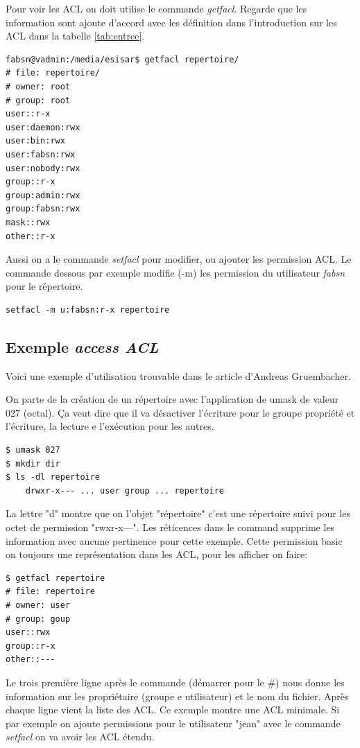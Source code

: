 Pour voir les ACL on doit utilise le commande \emph{getfacl}. Regarde que les information sont ajoute d'accord avec les définition dans l'introduction sur les ACL dans la tabelle \ref{tab:entree}. 

\begin{verbatim}
fabsn@vadmin:/media/esisar$ getfacl repertoire/
# file: repertoire/
# owner: root
# group: root
user::r-x
user:daemon:rwx
user:bin:rwx
user:fabsn:rwx
user:nobody:rwx
group::r-x
group:admin:rwx
group:fabsn:rwx
mask::rwx
other::r-x	
\end{verbatim}

Aussi on a le commande \emph{setfacl} pour modifier, ou ajouter les permission ACL. Le commande dessous par exemple modifie (-m) les permission du utilisateur \emph{fabsn} pour le répertoire. 

\begin{verbatim}
setfacl -m u:fabsn:r-x repertoire
\end{verbatim}

\subsection*{Exemple \emph{access ACL}}

Voici une exemple d'utilisation trouvable dans le article d'Andreas Gruembacher\cite{aclsuse}.

On parte de la création de un répertoire avec l'application de umask de valeur 027 (octal). Ça veut dire que il va   désactiver l'écriture pour le groupe propriété et l'écriture, la lecture e l'exécution pour les autres.

\begin{verbatim}
$ umask 027 
$ mkdir dir 
$ ls -dl repertoire
	drwxr-x--- ... user group ... repertoire
\end{verbatim}

La lettre "d" montre que on l'objet "répertoire" c'est une répertoire suivi pour les octet de permission "rwxr-x---". Les réticences dans le command supprime les information avec aucune pertinence pour cette exemple. Cette permission basic on toujours une représentation dans les ACL, pour les afficher on faire:

\begin{verbatim}
$ getfacl repertoire
# file: repertoire 
# owner: user 
# group: goup
user::rwx
group::r-x
other::---
\end{verbatim}

Le trois première ligne après le commande (démarrer pour le \#) nous donne les information sur les propriétaire (groupe e utilisateur) et le nom du fichier. Après chaque ligne vient la liste des ACL. Ce exemple montre une ACL minimale. Si par exemple on ajoute permissions pour le utilisateur "jean" avec le commande \emph{setfacl} on va avoir les ACL étendu.

